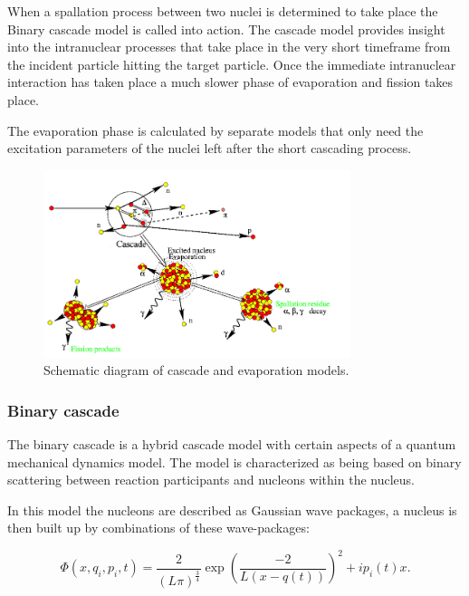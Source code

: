 When a spallation process between two nuclei is determined to take place the Binary cascade model is called into action. The cascade model provides insight into the intranuclear processes that take place in the very short timeframe from the incident particle hitting the target particle. Once the immediate intranuclear interaction has taken place a much slower phase of evaporation and fission takes place. 

The evaporation phase is calculated by separate models that only need the excitation parameters of the nuclei left after the short cascading process.

\begin{figure}[h]
\begin{center}
\includegraphics[width=0.8\textwidth]{images/inclScematic.png}  
\caption{\label{fig:inclschematic} Schematic diagram of cascade and evaporation models.}
 
 \end{center}
 \end{figure}

\subsubsection{Binary cascade}
The binary cascade is a hybrid cascade model with certain aspects of a quantum mechanical dynamics model. The model is characterized as being based on binary scattering between reaction participants and nucleons within the nucleus.

In this model the nucleons are described as Gaussian wave packages, a nucleus is then built up by combinations of these wave-packages:


\begin{equation}
\Phi(x,q_i,p_i,t) = \frac{2}{(L\pi)^{\frac{3}{4}}}\exp{\left(\frac{-2}{L(x - q(t))}\right)^2+ip_i(t)x}.
\label{wavePackage}
\end{equation}


